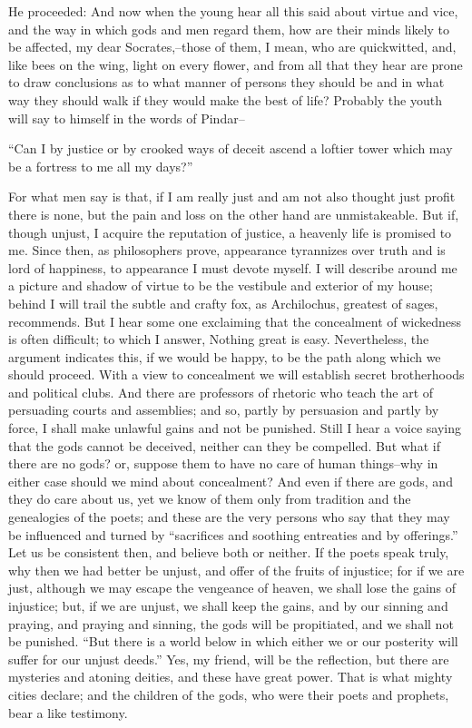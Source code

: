 He proceeded: And now when the young hear all this said about virtue and
vice, and the way in which gods and men regard them, how are their minds
likely to be affected, my dear Socrates,--those of them, I mean, who are
quickwitted, and, like bees on the wing, light on every flower, and from
all that they hear are prone to draw conclusions as to what manner of
persons they should be and in what way they should walk if they would
make the best of life? Probably the youth will say to himself in the
words of Pindar--

``Can I by justice or by crooked ways of deceit ascend a loftier tower
which may be a fortress to me all my days?''

For what men say is that, if I am really just and am not also thought
just profit there is none, but the pain and loss on the other hand
are unmistakeable. But if, though unjust, I acquire the reputation of
justice, a heavenly life is promised to me. Since then, as philosophers
prove, appearance tyrannizes over truth and is lord of happiness, to
appearance I must devote myself. I will describe around me a picture and
shadow of virtue to be the vestibule and exterior of my house; behind I
will trail the subtle and crafty fox, as Archilochus, greatest of sages,
recommends. But I hear some one exclaiming that the concealment of
wickedness is often difficult; to which I answer, Nothing great is easy.
Nevertheless, the argument indicates this, if we would be happy, to be
the path along which we should proceed. With a view to concealment we
will establish secret brotherhoods and political clubs. And there
are professors of rhetoric who teach the art of persuading courts and
assemblies; and so, partly by persuasion and partly by force, I shall
make unlawful gains and not be punished. Still I hear a voice saying
that the gods cannot be deceived, neither can they be compelled. But
what if there are no gods? or, suppose them to have no care of human
things--why in either case should we mind about concealment? And even if
there are gods, and they do care about us, yet we know of them only
from tradition and the genealogies of the poets; and these are the very
persons who say that they may be influenced and turned by ``sacrifices
and soothing entreaties and by offerings.'' Let us be consistent then,
and believe both or neither. If the poets speak truly, why then we had
better be unjust, and offer of the fruits of injustice; for if we are
just, although we may escape the vengeance of heaven, we shall lose the
gains of injustice; but, if we are unjust, we shall keep the gains, and
by our sinning and praying, and praying and sinning, the gods will be
propitiated, and we shall not be punished. ``But there is a world below
in which either we or our posterity will suffer for our unjust deeds.''
Yes, my friend, will be the reflection, but there are mysteries and
atoning deities, and these have great power. That is what mighty
cities declare; and the children of the gods, who were their poets and
prophets, bear a like testimony.

